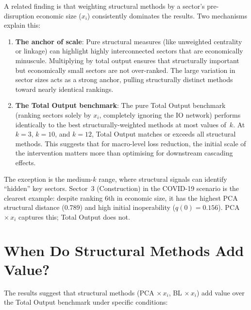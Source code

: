 A related finding is that weighting structural methods by a sector's pre-disruption economic size ($x_i$) consistently dominates the results. Two mechanisms explain this:

\begin{enumerate}
    \item \textbf{The anchor of scale}: Pure structural measures (like unweighted centrality or linkage) can highlight highly interconnected sectors that are economically minuscule. Multiplying by total output ensures that structurally important but economically small sectors are not over-ranked. The large variation in sector sizes acts as a strong anchor, pulling structurally distinct methods toward nearly identical rankings.

    \item \textbf{The Total Output benchmark}: The pure Total Output benchmark (ranking sectors solely by $x_i$, completely ignoring the IO network) performs identically to the best structurally-weighted methods at most values of~$k$. At $k = 3$, $k = 10$, and $k = 12$, Total Output matches or exceeds all structural methods. This suggests that for macro-level loss reduction, the initial scale of the intervention matters more than optimising for downstream cascading effects.
\end{enumerate}

The exception is the medium-$k$ range, where structural signals can identify ``hidden'' key sectors. Sector~3 (Construction) in the COVID-19 scenario is the clearest example: despite ranking 6th in economic size, it has the highest PCA structural distance (0.789) and high initial inoperability ($q(0) = 0.156$). PCA $\times\, x_i$ captures this; Total Output does not.


\section{When Do Structural Methods Add Value?}

The results suggest that structural methods (PCA $\times\, x_i$, BL $\times\, x_i$) add value over the Total Output benchmark under specific conditions:

